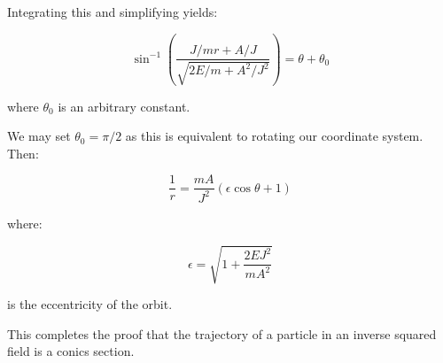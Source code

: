 \documentclass[12pt]{article}
\begin{document}
Integrating this and simplifying yields:

\begin{equation}
    \sin^{-1}{\left( \frac{J/mr + A/J}{\sqrt{2E/m + A^{2}/J^{2}}} \right)} = \theta + \theta_{0}
\end{equation}

where $\theta_{0}$ is an arbitrary constant.

We may set $\theta_{0} = \pi/2$ as this is equivalent to rotating our coordinate system. Then:

\begin{equation}
    \frac{1}{r} = \frac{mA}{J^{2}}(\epsilon \cos{\theta} + 1)
\end{equation}

where:

\begin{equation}
    \epsilon = \sqrt{1 + \frac{2EJ^{2}}{mA^{2}}}
\end{equation}

is the eccentricity of the orbit.

This completes the proof that the trajectory of a particle in an inverse squared field is a conics section.
\end{document}
